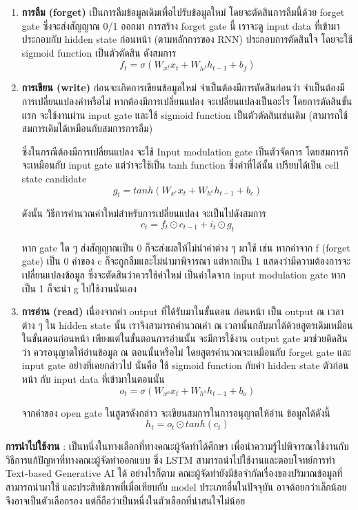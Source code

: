 \begin{enumerate}
    \item \textbf{การลืม (forget)} เป็นการลืมข้อมูลเดิมเพื่อไปรับข้อมูลใหม่ 
    โดยจะตัดสินการลืมนี้ด้วย forget gate ซึ่งจะส่งสัญญาณ 0/1 ออกมา การสร้าง 
    forget gate นี้ เราจะดู input data ที่เข้ามา ประกอบกับ hidden state 
    ก่อนหน้า (ตามหลักการของ RNN) ประกอบการตัดสินใจ โดยจะใช้ 
    sigmoid function เป็นตัวตัดสิน ดังสมการ
        \[f_t = \sigma(W_{x^f}x_t + W_{h^f}h_{t-1}+b_f) \]
    \item \textbf{การเขียน (write)} ก่อนจะเกิดการเขียนข้อมูลใหม่ 
    จำเป็นต้องมีการตัดสินก่อนว่า จำเป็นต้องมีการเปลี่ยนแปลงค่าหรือไม่ 
    หากต้องมีการเปลี่ยนแปลง จะเปลี่ยนแปลงเป็นอะไร โดยการตัดสินขั้นแรก 
    จะใช้งานผ่าน input gate และใช้ sigmoid function เป็นตัวตัดสินเช่นเดิม 
    (สามารถใช้สมการเดิมได้เหมือนกับสมการการลืม)
    \par ซึ่งในกรณีต้องมีการเปลี่ยนแปลง จะใช้ Input modulation gate 
    เป็นตัวจัดการ โดยสมการก็จะเหมือนกับ input gate แต่ว่าจะใช้เป็น 
    tanh function ซึ่งค่าที่ได้นั้น เปรียบได้เป็น cell state candidate
        \[ g_t = tanh(W_{x^c}x_t + W_{h^c}h_{t-1}+b_c) \]
    \par ดังนั้น วิธีการคำนวณค่าใหม่สำหรับการเปลี่ยนแปลง จะเป็นไปดังสมการ
        \[c_t = f_t \odot c_{t-1}+i_t \odot g_t \]
    \par หาก gate ใด ๆ ส่งสัญญาณเป็น 0 ก็จะส่งผลให้ไม่นำค่าต่าง ๆ มาใช้ เช่น 
    หากค่าจาก f (forget gate) เป็น 0 ค่าของ c ก็จะถูกลืมและไม่นำมาพิจารณา 
    แต่หากเป็น 1 แสดงว่ามีความต้องการจะเปลี่ยนแปลงข้อมูล ซึ่งจะตัดสินว่าควรใช้ค่าใหม่
    เป็นค่าใดจาก input modulation gate หากเป็น 1 ก็จะนำ g ไปใช้งานนั่นเอง
    \item \textbf{การอ่าน (read)} เนื่องจากค่า output ที่ได้รับมาในขั้นตอน
    ก่อนหน้า เป็น output ณ เวลาต่าง ๆ ใน hidden state นั้น 
    เราจึงสามารถคำนวณค่า ณ เวลานั้นกลับมาได้ด้วยสูตรเดิมเหมือนในขั้นตอนก่อนหน้า 
    เพียงแต่ในขั้นตอนการอ่านนั้น จะมีการใช้งาน output gate มาช่วยติดสินว่า
    ควรอนุญาตให้อ่านข้อมูล ณ ตอนนั้นหรือไม่ โดยสูตรคำนวณจะเหมือนกับ 
    forget gate และ input gate อย่างที่เคยกล่าวไป นั่นคือ ใช้ 
    sigmoid function กับค่า hidden state ตัวก่อนหน้า กับ input data 
    ที่เข้ามาในตอนนั้น
        \[ o_t = \sigma (W_{x^o}x_t+W_{h^o}h_{t-1}+b_o) \]
    \par จากค่าของ open gate ในสูตรดังกล่าว จะเขียนสมการในการอนุญาตให้อ่าน
    ข้อมูลได้ดังนี้
        \[ h_t = o_t \odot tanh(c_t) \]
\end{enumerate}
\textbf{การนำไปใช้งาน} : เป็นหนึ่งในทางเลือกที่ทางคณะผู้จัดทำได้ศึกษา
เพื่อนำความรู้ไปพิจารณาใช้งานกับวิธีการแก้ปัญหาที่ทางคณะผู้จัดทำออกแบบ ซึ่ง LSTM 
สามารถนำไปใช้งานและตอบโจทย์การทำ Text-based Generative AI ได้ 
อย่างไรก็ตาม คณะผู้จัดทำยังมีข้อจำกัดเรื่องของปริมาณข้อมูลที่สามารถนำมาใช้ 
และประสิทธิภาพที่เมื่อเทียบกับ model ประเภทอื่นในปัจจุบัน อาจด้อยกว่าเล็กน้อย 
จึงอาจเป็นตัวเลือกรอง แต่ก็ถือว่าเป็นหนึ่งในตัวเลือกที่น่าสนใจไม่น้อย

